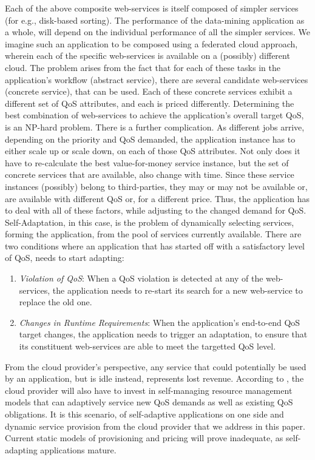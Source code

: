 \documentclass[10pt,journal,compsoc]{IEEEtran}
\begin{document}
Each of the above composite web-services is itself composed of simpler services (for e.g., disk-based sorting). The performance of the data-mining application as a whole, will depend on the individual performance of all the simpler services. We imagine such an application to be composed using a federated cloud approach, wherein each of the specific web-services is available on a (possibly) different cloud. The problem arises from the fact that for each of these tasks in the application's workflow (abstract service), there are several candidate web-services (concrete service), that can be used. Each of these concrete services exhibit a different set of QoS attributes, and each is priced differently. Determining the best combination of web-services to achieve the application's overall target QoS, is an NP-hard problem\cite{Ardagna2005Global}. There is a further complication. As different jobs arrive, depending on the priority and QoS demanded, the application instance has to either scale up or scale down, on each of those QoS attributes. Not only does it have to re-calculate the best value-for-money service instance, but the set of concrete services that are available, also change with time. Since these service instances (possibly) belong to third-parties, they may or may not be available or, are available with different QoS or, for a different price. Thus, the application has to deal with all of these factors, while adjusting to the changed demand for QoS.  Self-Adaptation, in this case, is the problem of dynamically selecting services, forming the application, from the pool of services currently available. There are two conditions where an application that has started off with a satisfactory level of QoS, needs to start adapting:
	\begin{enumerate}
	    \item \textit{Violation of QoS}: When a QoS violation is detected at any of the web-services, the application needs to re-start its search for a new web-service to replace the old one.
	     \item \textit{Changes in Runtime Requirements}: When the application's end-to-end QoS target changes, the application needs to trigger an adaptation, to ensure that its constituent web-services are able to meet the targetted QoS level.
	\end{enumerate} 
From the cloud provider's perspective, any service that could potentially be used by an application, but is idle instead, represents lost revenue. According to \cite{Buyya2008Market-Oriented}, the cloud provider will also have to invest in self-managing resource management models that can adaptively service new QoS demands as well as existing QoS obligations. It is this scenario, of self-adaptive applications on one side and dynamic service provision from the cloud provider that we address in this paper. Current static models of provisioning and pricing will prove inadequate, as self-adapting applications mature.
  
\end{document}

